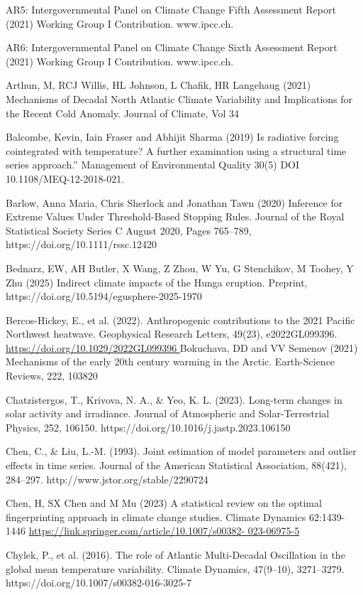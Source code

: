\documentclass[12pt,paper=a4,DIV=12,parskip=never,chapterprefix=false,headings=standardclasses]{scrreprt}
\begin{document}
AR5: Intergovernmental Panel on Climate Change Fifth Assessment Report (2021) Working Group I
Contribution. www.ipcc.ch.

AR6: Intergovernmental Panel on Climate Change Sixth Assessment Report (2021) Working Group I
Contribution. www.ipcc.ch.

Arthun, M, RCJ Willis, HL Johnson, L Chafik, HR Langehaug (2021) Mechanisms of Decadal North
Atlantic Climate Variability and Implications for the Recent Cold Anomaly. Journal of Climate, Vol 34

Balcombe, Kevin, Iain Fraser and Abhijit Sharma (2019) Is radiative forcing cointegrated with temperature?
A further examination using a structural time series approach.” Management of Environmental Quality
30(5) DOI 10.1108/MEQ-12-2018-021.

Barlow, Anna Maria, Chris Sherlock and Jonathan Tawn (2020) Inference for Extreme Values Under
Threshold-Based Stopping Rules. Journal of the Royal Statistical Society Series C August 2020,
Pages 765–789, https://doi.org/10.1111/rssc.12420

Bednarz, EW, AH Butler, X Wang, Z Zhou, W Yu, G Stenchikov, M Toohey, Y Zhu (2025) Indirect
climate impacts of the Hunga eruption. Preprint, https://doi.org/10.5194/egusphere-2025-1970

Bercos-Hickey, E., et al. (2022). Anthropogenic contributions to the 2021 Pacific Northwest heatwave.
Geophysical Research Letters, 49(23), e2022GL099396. \url{https://doi.org/10.1029/2022GL099396
}
Bokuchava, DD and VV Semenov (2021) Mechanisms of the early 20th century warming in the Arctic.
Earth-Science Reviews, 222, 103820

Chatzistergos, T., Krivova, N. A., \& Yeo, K. L. (2023). Long-term changes in solar activity and
irradiance. Journal of Atmospheric and Solar-Terrestrial Physics, 252, 106150.
https://doi.org/10.1016/j.jastp.2023.106150

Chen, C., \& Liu, L.-M. (1993). Joint estimation of model parameters and outlier effects in time series.
Journal of the American Statistical Association, 88(421), 284–297.
http://www.jstor.org/stable/2290724

Chen, H, SX Chen and M Mu (2023) A statistical review on the optimal fingerprinting approach in climate
change studies. Climate Dynamics 62:1439-1446 \url{https://link.springer.com/article/10.1007/s00382-
023-06975-5}

Chylek, P., et al. (2016). The role of Atlantic Multi-Decadal Oscillation in the global mean temperature
variability. Climate Dynamics, 47(9–10), 3271–3279. https://doi.org/10.1007/s00382-016-3025-7
\end{document}
